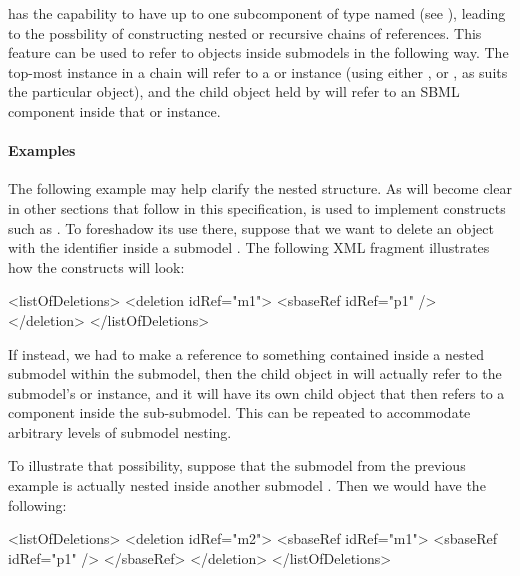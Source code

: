 
\SBaseRef has the capability to have up to one subcomponent of type
\SBaseRef named  (see ), leading to
the possbility of constructing nested or recursive chains of references.
This feature can be used to refer to objects inside submodels in the
following way.  The top-most \SBaseRef instance in a chain will refer to
a \Model or \ExternalModelDefinition instance (using either
,  or , as suits the
particular object), and the child \SBaseRef object held by
 will refer to an SBML component inside that \Model or
\ExternalModelDefinition instance.


\paragraph{Examples}

The following example may help clarify the nested structure.  As will
become clear in other sections that follow in this specification,
\SBaseRef is used to implement constructs such as \Deletion.  To
foreshadow its use there, suppose that we want to delete an object with
the identifier  inside a submodel .  The following XML
fragment illustrates how the constructs will look:

\begin{example}
<listOfDeletions>
  <deletion idRef="m1">
    <sbaseRef idRef="p1" />
  </deletion>
</listOfDeletions>
\end{example}

If instead, we had to make a reference to something contained inside a
nested submodel within the submodel, then the child \SBaseRef object in
 will actually refer to the submodel's \Model or
\ExternalModelDefinition instance, and it will have its own child
 object that then refers to a component inside the
sub-submodel.  This can be repeated to accommodate arbitrary levels of
submodel nesting.  

To illustrate that possibility, suppose that the submodel  from
the previous example is actually nested inside another submodel
.  Then we would have the following:

\begin{example}
<listOfDeletions>
  <deletion idRef="m2">
    <sbaseRef idRef="m1">
      <sbaseRef idRef="p1" />
    </sbaseRef>
  </deletion>
</listOfDeletions>
\end{example}

